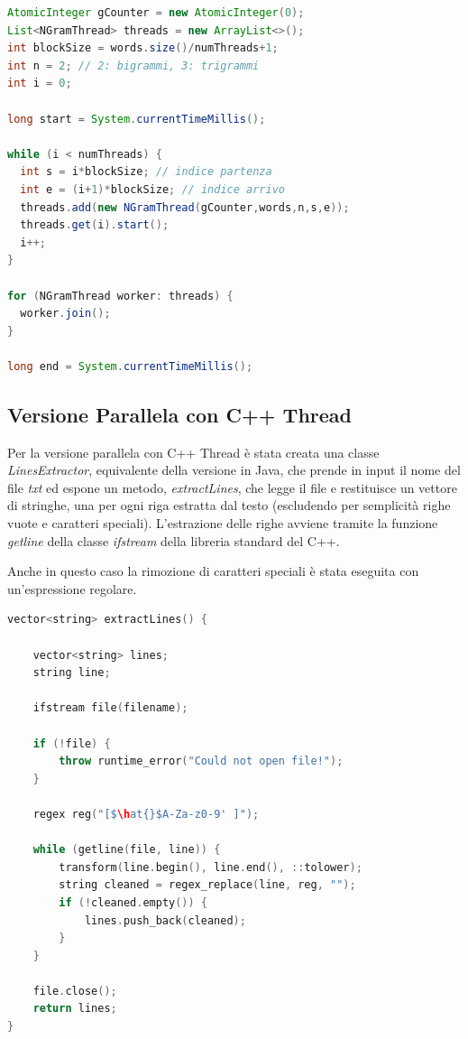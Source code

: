 \documentclass[10pt,twocolumn,letterpaper]{article}
\begin{document}
\begin{lstlisting}[basicstyle=\scriptsize, language=Java, frame=single, caption={Lancio di Java Thread per ricerca di bigrammi/trigrammi},captionpos=b]
AtomicInteger gCounter = new AtomicInteger(0);
List<NGramThread> threads = new ArrayList<>();
int blockSize = words.size()/numThreads+1;
int n = 2; // 2: bigrammi, 3: trigrammi
int i = 0;

long start = System.currentTimeMillis();

while (i < numThreads) {
  int s = i*blockSize; // indice partenza
  int e = (i+1)*blockSize; // indice arrivo
  threads.add(new NGramThread(gCounter,words,n,s,e));
  threads.get(i).start();
  i++;
}

for (NGramThread worker: threads) {
  worker.join();
}

long end = System.currentTimeMillis();
\end{lstlisting}

\subsection{Versione Parallela con C++ Thread}
Per la versione parallela con C++ Thread è stata creata una classe \textit{LinesExtractor}, equivalente della versione in Java, che prende in input il nome del file \textit{txt} ed espone un metodo, \textit{extractLines}, che legge il file e restituisce un vettore di stringhe, una per ogni riga estratta dal testo (escludendo per semplicità righe vuote e caratteri speciali). L'estrazione delle righe avviene tramite la funzione \textit{getline} della classe \textit{ifstream} della libreria standard del C++.

Anche in questo caso la rimozione di caratteri speciali è stata eseguita con un’espressione regolare.\newline

\begin{lstlisting}[basicstyle=\scriptsize, language=C++, frame=single, caption={Esempio di estrazione di righe da un file in C++},captionpos=b,showstringspaces=false, mathescape=true]
vector<string> extractLines() {

    vector<string> lines;
    string line;
    
    ifstream file(filename);

    if (!file) {
        throw runtime_error("Could not open file!");
    }

    regex reg("[$\hat{}$A-Za-z0-9' ]");

    while (getline(file, line)) {
        transform(line.begin(), line.end(), ::tolower);
        string cleaned = regex_replace(line, reg, "");
        if (!cleaned.empty()) {
            lines.push_back(cleaned);
        }
    }

    file.close();
    return lines;
}
\end{lstlisting}
\end{document}
